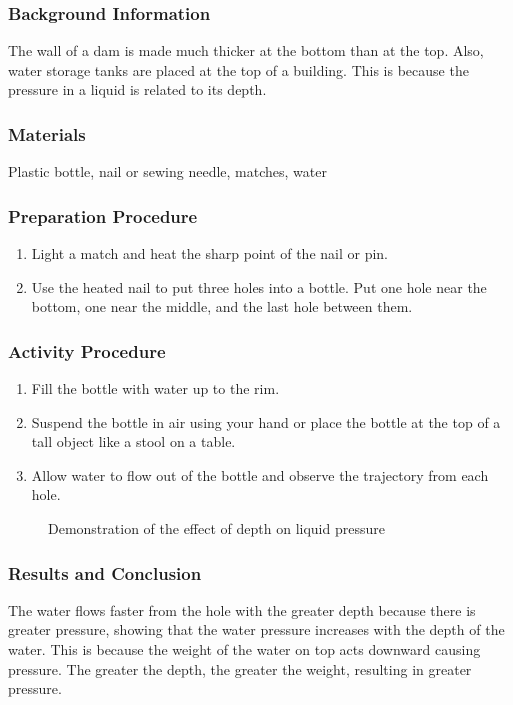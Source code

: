 \subsubsection*{Background Information}
The wall of a dam is made much thicker at the bottom than at the top. Also, water storage tanks are placed at the top of a building. This is because the pressure in a liquid is related to its depth.

\subsubsection*{Materials}
Plastic bottle, nail or sewing needle, matches, water


\subsubsection*{Preparation Procedure}
\begin{enumerate}
\item{Light a match and heat the sharp point of the nail or pin.} 
\item{Use the heated nail to put three holes into a bottle. Put one hole near the bottom, one near the middle, and the last hole between them.} 
\end{enumerate}

\subsubsection*{Activity Procedure}
\begin{enumerate}
\item{Fill the bottle with water up to the rim.} 
\item{Suspend the bottle in air using your hand or place the bottle at the top of a tall object like a stool on a table.} 
\item{Allow water to flow out of the bottle and observe the trajectory from each hole.} 
\end{enumerate}

\begin{figure}
\begin{center}
\def\svgwidth{2cm}

\caption{Demonstration of the effect of depth on liquid pressure}
\label{fig:pressure-liquid}
\end{center}
\end{figure}

\subsubsection*{Results and Conclusion}
The water flows faster from the hole with the greater depth because there is greater pressure, showing that the water pressure increases with the depth of the water. This is because the weight of the water on top acts downward causing pressure. The greater the depth, the greater the weight, resulting in greater pressure. 

